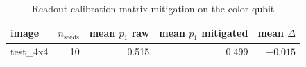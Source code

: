 
\begin{table}[htbp]
\centering
\caption{Readout calibration-matrix mitigation on the color qubit}
\label{tab:readout_summary}
\begin{tabular}{lrrrr}
\toprule
image & $n_{\mathrm{seeds}}$ & mean $p_1$ raw & mean $p_1$ mitigated & mean $\Delta$ \\
\midrule
test\_4x4 & 10 & 0.515 & 0.499 & $-0.015$ \\
\bottomrule
\end{tabular}
\end{table}

